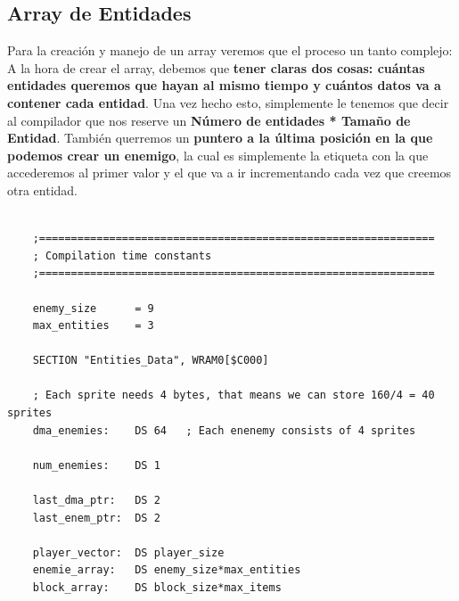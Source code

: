 \subsection{Array de Entidades}

Para la creación y manejo de un array veremos que el proceso un tanto complejo: \\

A la hora de crear el array, debemos que \textbf{tener claras dos cosas: cuántas entidades queremos que hayan al mismo tiempo y cuántos datos va a contener cada entidad}. Una vez hecho esto, simplemente le tenemos que decir al compilador que nos reserve un \textbf{Número de entidades * Tamaño de Entidad}. También querremos un \textbf{puntero a la última posición en la que podemos crear un enemigo}, la cual es simplemente la etiqueta con la que accederemos al primer valor y el que va a ir incrementando cada vez que creemos otra entidad.

\begin{lstlisting}[caption={Reserva Memoria}, label={code:memory}]

    ;==============================================================
    ; Compilation time constants
    ;==============================================================

    enemy_size      = 9
    max_entities 	= 3

    SECTION "Entities_Data", WRAM0[$C000]

    ; Each sprite needs 4 bytes, that means we can store 160/4 = 40 sprites
    dma_enemies:    DS 64 	; Each enenemy consists of 4 sprites

    num_enemies: 	DS 1

    last_dma_ptr:   DS 2
    last_enem_ptr: 	DS 2

    player_vector:  DS player_size
    enemie_array: 	DS enemy_size*max_entities
    block_array: 	DS block_size*max_items

\end{lstlisting}

\clearpage

